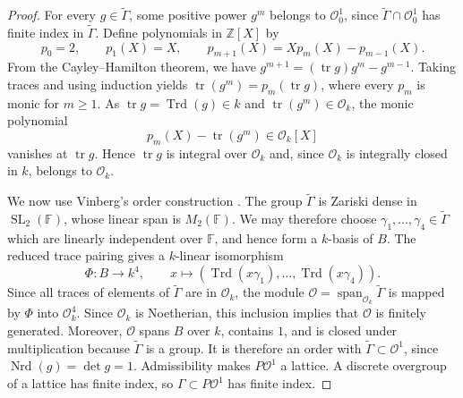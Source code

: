 \documentclass[reqno]{amsart}
\theoremstyle{remark}
\DeclareMathOperator{\tr}{tr}
\DeclareMathOperator{\Trd}{Trd}
\DeclareMathOperator{\Nrd}{Nrd}
\DeclareMathOperator{\SL}{SL}
\newcommand{\Z}{\mathbb Z}
\newcommand{\F}{\mathbb F}
\newcommand{\G}{\widetilde\Gamma}
\newcommand{\OO}{\mathcal O}
\begin{document}
\begin{proof}
For every $g\in\G$, some positive power $g^m$ belongs to $\OO_0^1$, since $\G\cap\OO_0^1$ has finite index in $\G$. Define polynomials in $\Z[X]$ by
$$
p_0=2,\qquad p_1(X)=X,\qquad p_{m+1}(X) = X p_m(X)-p_{m-1}(X).
$$
From the Cayley--Hamilton theorem, we have $g^{m+1} = (\tr g) g^m - g^{m-1}$. Taking traces and using induction yields $\tr(g^m)=p_m(\tr g)$, where every $p_m$ is monic for $m\ge1$. As $\tr g=\Trd(g)\in k$ and $\tr(g^m)\in\OO_k$, the monic polynomial
$$
p_m(X)-\tr(g^m)\in\OO_k[X]
$$
vanishes at $\tr g$. Hence $\tr g$ is integral over $\OO_k$ and, since $\OO_k$ is integrally closed in $k$, belongs to $\OO_k$.

We now use Vinberg's order construction \cite[p.~188, equation (27)]{Vinberg}. The group $\G$ is Zariski dense in $\SL_2(\F)$, whose linear span is $M_2(\F)$. We may therefore choose $\gamma_1,\ldots,\gamma_4\in\G$ which are linearly independent over $\F$, and hence form a $k$-basis of $B$. The reduced trace pairing gives a $k$-linear isomorphism
$$
\Phi:B\longrightarrow k^4,\qquad
x\longmapsto(\Trd(x\gamma_1),\ldots,\Trd(x\gamma_4)).
$$
Since all traces of elements of $\G$ are in $\OO_k$, the module $\OO=\operatorname{span}_{\OO_k}\G$ is mapped by $\Phi$ into $\OO_k^4$. Since $\OO_k$ is Noetherian, this inclusion implies that $\OO$ is finitely generated. Moreover, $\OO$ spans $B$ over $k$, contains $1$, and is closed under multiplication because $\G$ is a group. It is therefore an order with $\G\subset\OO^1$, since $\Nrd(g) = \det g = 1$. Admissibility makes $P\OO^1$ a lattice. A discrete overgroup of a lattice has finite index, so $\Gamma\subset P\OO^1$ has finite index.
\end{proof}
\end{document}
